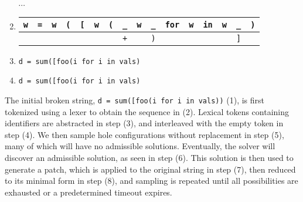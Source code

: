 \documentclass[runningheads]{llncs}
\begin{document}
\begin{enumerate}[leftmargin=.23\linewidth]
\begin{tabular}{|||c|||c|||c|||c|||c|||c|||c|||c|||c|||c|||c|||c|||c|||c|||c|||}
  \end{tabular}\\$\cdots$
  \item \begin{tabular}{|||c|||c|||c|||c|||c|||c|||c||c|c|||c|||c|||c|||c|||c|||c|||c|||}
          \hline
          \texttt{w} & \texttt{=} & \texttt{w} & \texttt{(} & \texttt{[} & \texttt{w} & \texttt{(} & \cellcolor{black!15}\texttt{\_} &  \texttt{w} & \cellcolor{black!15}\texttt{\_} & \texttt{for} & \texttt{w} & \texttt{in} & \texttt{w} & \cellcolor{black!15}\texttt{\_} & \texttt{)} \\\hline
          & & & & & & & \cellcolor{green!25}\texttt{+} & & \cellcolor{orange!25}\texttt{)} & & & & & \cellcolor{orange!25}\texttt{]} & \\\hline
  \end{tabular}
  \item \texttt{d = sum([foo(\hlgreen{+}i\hlorange{)} for i in vals\hlorange{]})}
  \item \texttt{d = sum([foo(i\hlorange{)} for i in vals\hlorange{]})}
\end{enumerate}

The initial broken string, \texttt{d = sum([foo(i\err{]} for i in vals))} (1), is first tokenized using a lexer to obtain the sequence in (2). Lexical tokens containing identifiers are abstracted in step (3), and interleaved with the empty token in step (4). We then sample hole configurations without replacement in step (5), many of which will have no admissible solutions. Eventually, the solver will discover an admissible solution, as seen in step (6). This solution is then used to generate a patch, which is applied to the original string in step (7), then reduced to its minimal form in step (8), and sampling is repeated until all possibilities are exhausted or a predetermined timeout expires.
\end{document}
